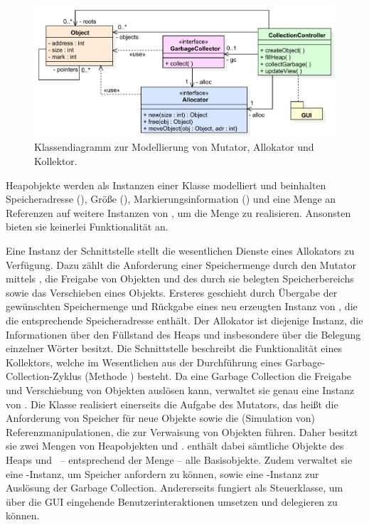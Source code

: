 \begin{figure}[h]
	\centering
	\includegraphics[scale=0.6]{img/uml/ch7-model.pdf}
	\caption[Klassendiagramm zur Modellierung von Mutator, Allokator und Kollektor]{Klassendiagramm zur Modellierung von Mutator, Allokator und Kollektor.}
	\label{fig:model}
\end{figure}

Heapobjekte werden als Instanzen einer Klasse  modelliert und beinhalten Speicheradresse (), Größe (), Markierungsinformation () und eine Menge  an Referenzen auf weitere Instanzen von , um die Menge \Pointers zu realisieren.
Ansonsten bieten sie keinerlei Funktionalität an.

Eine Instanz der Schnittstelle  stellt die wesentlichen Dienste eines Allokators zu Verfügung.
Dazu zählt die Anforderung einer Speichermenge durch den Mutator mittels , die Freigabe von Objekten und des durch sie belegten Speicherbereichs sowie das Verschieben eines Objekts.
Ersteres geschieht durch Übergabe der gewünschten Speichermenge und Rückgabe eines neu erzeugten Instanz von , die die entsprechende Speicheradresse enthält.
Der Allokator ist diejenige Instanz, die Informationen über den Füllstand des Heaps und insbesondere über die Belegung einzelner Wörter besitzt.
Die Schnittstelle  beschreibt die Funktionalität eines Kollektors, welche im Wesentlichen aus der Durchführung eines Garbage-Collection-Zyklus (Methode ) besteht.
Da eine Garbage Collection die Freigabe und Verschiebung von Objekten auslösen kann, verwaltet sie genau eine Instanz von .
Die Klasse  realisiert einerseits die Aufgabe des Mutators, das heißt die Anforderung von Speicher für neue Objekte sowie die (Simulation von) Referenzmanipulationen, die zur Verwaisung von Objekten führen.
Daher besitzt sie zwei Mengen von Heapobjekten  und .
 enthält dabei sämtliche Objekte des Heaps und \ -- entsprechend der Menge \Roots -- alle Basisobjekte.
Zudem verwaltet sie eine -Instanz, um Speicher anfordern zu können, sowie eine -Instanz zur Auslösung der Garbage Collection.
Andererseits fungiert  als Steuerklasse, um über die GUI eingehende Benutzerinteraktionen umsetzen und delegieren zu können.

